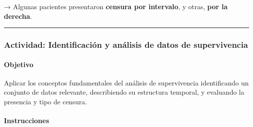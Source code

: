 \documentclass[
  letterpaper,
  DIV=11,
  numbers=noendperiod]{scrartcl}
\begin{document}
→ Algunas pacientes presentaron \textbf{censura por intervalo}, y otras,
\textbf{por la derecha}.

\begin{center}\rule{0.5\linewidth}{0.5pt}\end{center}

\subsubsection{Actividad: Identificación y análisis de datos de
supervivencia}\label{actividad-identificaciuxf3n-y-anuxe1lisis-de-datos-de-supervivencia}

\paragraph{Objetivo}\label{objetivo}

Aplicar los conceptos fundamentales del análisis de supervivencia
identificando un conjunto de datos relevante, describiendo su estructura
temporal, y evaluando la presencia y tipo de censura.

\paragraph{Instrucciones}\label{instrucciones}
\end{document}
